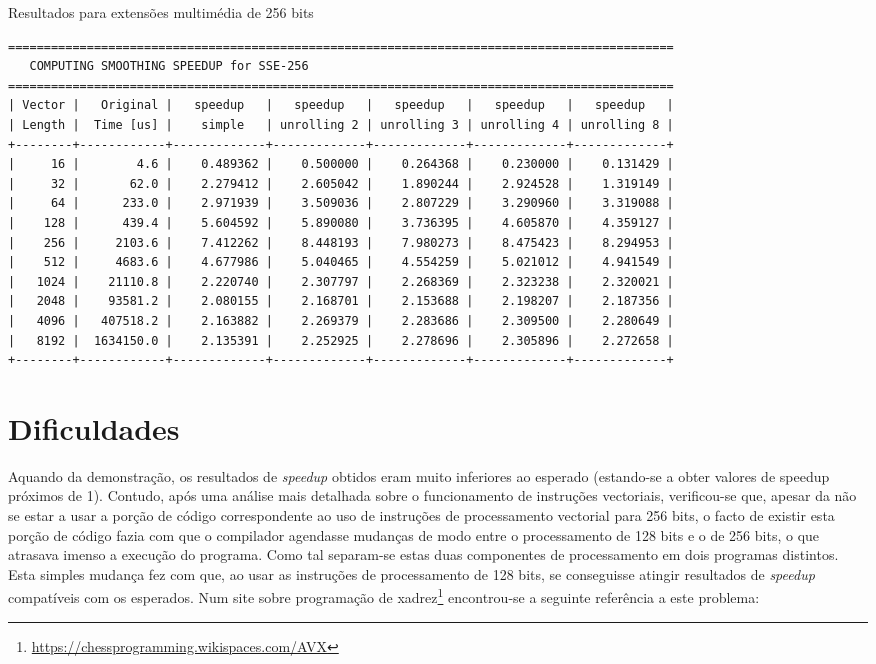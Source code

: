 \documentclass[a4paper]{article}
\begin{document}
	
	\begin{table}[h]
	\caption{Resultados para extensões multimédia de 256 bits}
	\label{tab:results_256}
	\begin{Verbatim}[fontsize=\small,xleftmargin=-3mm]
=============================================================================================
   COMPUTING SMOOTHING SPEEDUP for SSE-256
=============================================================================================
| Vector |   Original |   speedup   |   speedup   |   speedup   |   speedup   |   speedup   |
| Length |  Time [us] |    simple   | unrolling 2 | unrolling 3 | unrolling 4 | unrolling 8 |
+--------+------------+-------------+-------------+-------------+-------------+-------------+
|     16 |        4.6 |    0.489362 |    0.500000 |    0.264368 |    0.230000 |    0.131429 |
|     32 |       62.0 |    2.279412 |    2.605042 |    1.890244 |    2.924528 |    1.319149 |
|     64 |      233.0 |    2.971939 |    3.509036 |    2.807229 |    3.290960 |    3.319088 |
|    128 |      439.4 |    5.604592 |    5.890080 |    3.736395 |    4.605870 |    4.359127 |
|    256 |     2103.6 |    7.412262 |    8.448193 |    7.980273 |    8.475423 |    8.294953 |
|    512 |     4683.6 |    4.677986 |    5.040465 |    4.554259 |    5.021012 |    4.941549 |
|   1024 |    21110.8 |    2.220740 |    2.307797 |    2.268369 |    2.323238 |    2.320021 |
|   2048 |    93581.2 |    2.080155 |    2.168701 |    2.153688 |    2.198207 |    2.187356 |
|   4096 |   407518.2 |    2.163882 |    2.269379 |    2.283686 |    2.309500 |    2.280649 |
|   8192 |  1634150.0 |    2.135391 |    2.252925 |    2.278696 |    2.305896 |    2.272658 |
+--------+------------+-------------+-------------+-------------+-------------+-------------+
	\end{Verbatim}
	\end{table}

	
	\section{Dificuldades}
	
	 Aquando da demonstração, os resultados de \textit{speedup} obtidos eram muito inferiores ao esperado (estando-se a obter valores de speedup próximos de 1). Contudo, após uma análise mais detalhada sobre o funcionamento de instruções vectoriais, verificou-se que, apesar da não se estar a usar a porção de código correspondente ao uso de instruções de processamento vectorial para 256 bits, o facto de existir esta porção de código fazia com que o compilador agendasse mudanças de modo entre o processamento de 128 bits e o de 256 bits, o que atrasava imenso a execução do programa. Como tal separam-se estas duas componentes de processamento em dois programas distintos. Esta simples mudança fez com que, ao usar as instruções de processamento de 128 bits, se conseguisse atingir resultados de \textit{speedup} compatíveis com os esperados. Num site sobre programação de xadrez\footnote{\url{https://chessprogramming.wikispaces.com/AVX}} encontrou-se a seguinte referência a este problema:
	 
\end{document}
